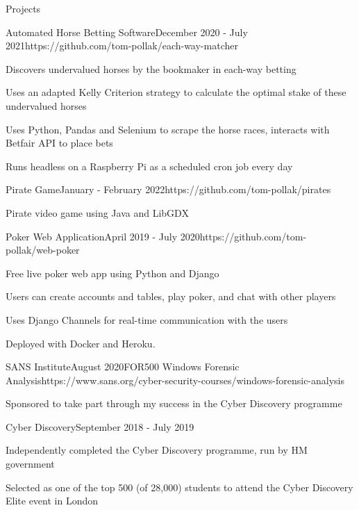 \documentclass{structure} %
\begin{document}
\begin{rSection}{Projects}

\begin{rSubsection}{Automated Horse Betting Software}{December 2020 - July 2021}{}{}{https://github.com/tom-pollak/each-way-matcher}
    \item Discovers undervalued horses by the bookmaker in each-way betting
    \item Uses an adapted Kelly Criterion strategy to calculate the optimal stake of these undervalued horses
    \item Uses Python, Pandas and Selenium to scrape the horse races, interacts with Betfair API to place bets
    \item Runs headless on a Raspberry Pi as a scheduled cron job every day
\end{rSubsection}

\begin{rSubsection}{Pirate Game}{January - February 2022}{}{}{https://github.com/tom-pollak/pirates}
    \item Pirate video game using Java and LibGDX
\end{rSubsection}

\begin{rSubsection}{Poker Web Application}{April 2019 - July 2020}{}{}{https://github.com/tom-pollak/web-poker}
    \item Free live poker web app using Python and Django
    \item Users can create accounts and tables, play poker, and chat with other players
    \item Uses Django Channels for real-time communication with the users
    \item Deployed with Docker and Heroku.
\end{rSubsection}

\begin{rSubsection}{SANS Institute}{August 2020}{FOR500 Windows Forensic Analysis}{}{https://www.sans.org/cyber-security-courses/windows-forensic-analysis}
    \item Sponsored to take part through my success in the Cyber Discovery programme
\end{rSubsection}

\begin{rSubsection}{Cyber Discovery}{September 2018 - July 2019}{}{}{}
    \item Independently completed the Cyber Discovery programme, run by HM government
    \item Selected as one of the top 500 (of 28,000) students to attend the Cyber Discovery Elite event in London
\end{rSubsection}
    

\end{rSection}
\end{document}
